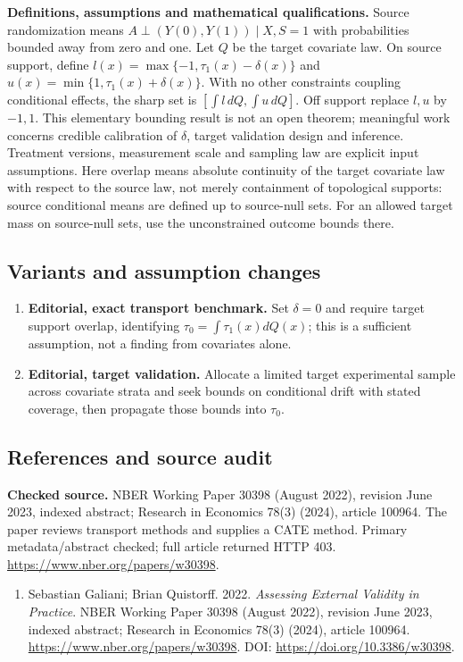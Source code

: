 \documentclass[11pt,a4paper]{article}
\begin{document}
\textbf{Definitions, assumptions and mathematical qualifications.} Source randomization means \(A\perp(Y(0),Y(1))\mid X,S=1\) with probabilities bounded away from zero and one. Let \(Q\) be the target covariate law. On source support, define \(l(x)=\max\{-1,\tau_1(x)-\delta(x)\}\) and \(u(x)=\min\{1,\tau_1(x)+\delta(x)\}\). With no other constraints coupling conditional effects, the sharp set is \([\int l\,dQ,\int u\,dQ]\). Off support replace \(l,u\) by \(-1,1\). This elementary bounding result is not an open theorem; meaningful work concerns credible calibration of \(\delta\), target validation design and inference. Treatment versions, measurement scale and sampling law are explicit input assumptions. Here overlap means absolute continuity of the target covariate law with respect to the source law, not merely containment of topological supports: source conditional means are defined up to source-null sets. For an allowed target mass on source-null sets, use the unconstrained outcome bounds there.
\subsection*{Variants and assumption changes}
\begin{enumerate}
\item \textbf{Editorial, exact transport benchmark.} Set \(\delta=0\) and require target support overlap, identifying \(\tau_0=\int\tau_1(x)dQ(x)\); this is a sufficient assumption, not a finding from covariates alone.
\item \textbf{Editorial, target validation.} Allocate a limited target experimental sample across covariate strata and seek bounds on conditional drift with stated coverage, then propagate those bounds into \(\tau_0\).
\end{enumerate}
\subsection*{References and source audit}
\textbf{Checked source.} NBER Working Paper 30398 (August 2022), revision June 2023, indexed abstract; Research in Economics 78(3) (2024), article 100964. The paper reviews transport methods and supplies a CATE method. Primary metadata/abstract checked; full article returned HTTP 403. \url{https://www.nber.org/papers/w30398}.
\begin{enumerate}\raggedright
\item\hypertarget{definitions:source:30007702:1}{} Sebastian Galiani; Brian Quistorff. 2022. \emph{Assessing External Validity in Practice}. NBER Working Paper 30398 (August 2022), revision June 2023, indexed abstract; Research in Economics 78(3) (2024), article 100964.
\url{https://www.nber.org/papers/w30398}.
DOI: \url{https://doi.org/10.3386/w30398}.
\end{enumerate}
\end{document}
